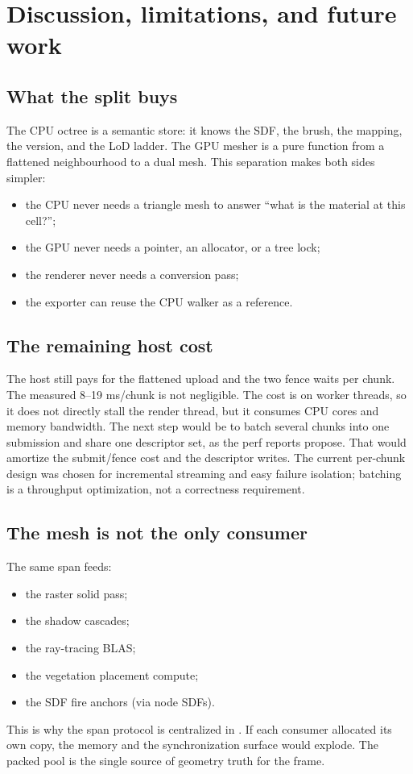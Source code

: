 \section{Discussion, limitations, and future work}
\label{sec:discussion}

\subsection{What the split buys}

The CPU octree is a semantic store: it knows the SDF, the brush, the
mapping, the version, and the LoD ladder.  The GPU mesher is a pure
function from a flattened neighbourhood to a dual mesh.  This separation
makes both sides simpler:
\begin{itemize}
\item the CPU never needs a triangle mesh to answer ``what is the
  material at this cell?'';
\item the GPU never needs a pointer, an allocator, or a tree lock;
\item the renderer never needs a conversion pass;
\item the exporter can reuse the CPU walker as a reference.
\end{itemize}

\subsection{The remaining host cost}

The host still pays for the flattened upload and the two fence waits per
chunk.  The measured 8--19 ms/chunk is not negligible.  The cost is on
worker threads, so it does not directly stall the render thread, but it
consumes CPU cores and memory bandwidth.  The next step would be to batch
several chunks into one submission and share one descriptor set, as the
perf reports propose.  That would amortize the submit/fence cost and the
descriptor writes.  The current per-chunk design was chosen for
incremental streaming and easy failure isolation; batching is a
throughput optimization, not a correctness requirement.

\subsection{The mesh is not the only consumer}

The same span feeds:
\begin{itemize}
\item the raster solid pass;
\item the shadow cascades;
\item the ray-tracing BLAS;
\item the vegetation placement compute;
\item the SDF fire anchors (via node SDFs).
\end{itemize}
This is why the span protocol is centralized in .
If each consumer allocated its own copy, the memory and the synchronization
surface would explode.  The packed pool is the single source of geometry
truth for the frame.

